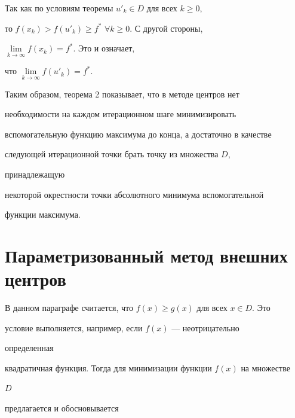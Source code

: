  


\begin{pf} Так как по условиям теоремы $u'_k\in D$ для всех $k\ge 0$, 


то $f(x_k)>f(u'_k)\ge f^*$ $\forall k\ge 0$. С другой стороны, 


$\lim\limits_{k\to\infty}f(x_k)=f^*$. Это и означает, 


что $\lim\limits_{k\to\infty}f(u'_k)=f^*$. 


\end{pf} 


 


Таким образом, теорема 2 показывает, что в методе центров нет 


необходимости на каждом итерационном шаге минимизировать 


вспомогательную функцию максимума до конца, а достаточно в качестве 


следующей итерационной точки брать точку из множества $D$, 


принадлежащую 


некоторой окрестности точки абсолютного минимума вспомогательной 


функции максимума. 


 


\section{Параметризованный метод внешних центров} 


 


В данном параграфе считается, что $f(x)\ge g(x)$ для всех $x\in D$. Это 


условие выполняется, например, если $f(x)$ --- неотрицательно 


определенная 


квадратичная функция. Тогда для минимизации функции $f(x)$ на множестве 


$D$ 


предлагается и обосновывается 


 


